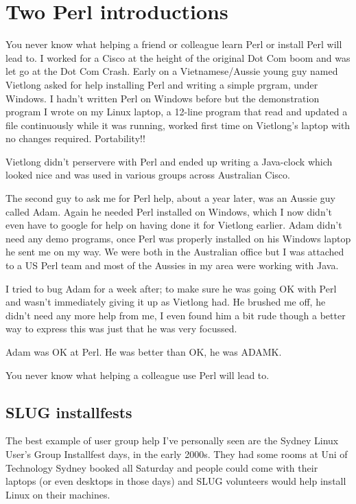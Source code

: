 \documentclass{article}      %
\begin{document}
\section{Two Perl introductions}

You never know what helping a friend or colleague learn Perl or
install Perl will lead to. I worked for a Cisco at the height of the
original Dot Com boom and was let go at the Dot Com Crash. Early on a
Vietnamese/Aussie young guy named Vietlong asked for help installing
Perl and writing a simple prgram, under Windows. I hadn't written Perl
on Windows before but the demonstration program I wrote on my Linux
laptop, a 12-line program that read and updated a file continuously
while it was running, worked first time on Vietlong's laptop with no
changes required. Portability!!

Vietlong didn't perservere with Perl and ended up writing a Java-clock
which looked nice and was used in various groups across Australian
Cisco.

The second guy to ask me for Perl help, about a year later, was an
Aussie guy called Adam. Again he needed Perl installed on Windows,
which I now didn't even have to google for help on having done it for
Vietlong earlier. Adam didn't need any demo programs, once Perl was
properly installed on his Windows laptop he sent me on my way. We were
both in the Australian office but I was attached to a US Perl team and
most of the Aussies in my area were working with Java.

I tried to bug Adam for a week after; to make sure he was going OK
with Perl and wasn't immediately giving it up as Vietlong had. He
brushed me off, he didn't need any more help from me, I even found him
a bit rude though a better way to express this was just that he was
very focussed.

Adam was OK at Perl. He was better than OK, he was ADAMK.

You never know what helping a colleague use Perl will lead to.

\subsection{SLUG installfests}

The best example of user group help I've personally seen are the
Sydney Linux User's Group Installfest days, in the early 2000s. They
had some rooms at Uni of Technology Sydney booked all Saturday and
people could come with their laptops (or even desktops in those days)
and SLUG volunteers would help install Linux on their machines.
\end{document}
